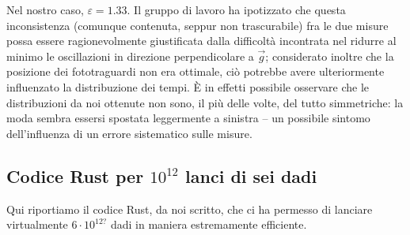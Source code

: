 \documentclass{article}
\begin{document}
Nel nostro caso, $\varepsilon = 1.33$. Il gruppo di lavoro ha ipotizzato che
questa inconsistenza (comunque contenuta, seppur non trascurabile) fra le due
misure possa essere ragionevolmente giustificata dalla difficoltà incontrata
nel ridurre al minimo le oscillazioni in direzione perpendicolare a $\vec{g}$;
considerato inoltre che la posizione dei fototraguardi non era ottimale, ciò
potrebbe avere ulteriormente influenzato la distribuzione dei tempi. È in
effetti possibile osservare che le distribuzioni da noi ottenute non sono,
il più delle volte, del tutto simmetriche: la moda sembra essersi spostata
leggermente a sinistra – un possibile sintomo dell'influenza di un
errore sistematico sulle misure.

\pagebreak
\begin{appendices}
    \section{Codice Rust per $10^{12}$ lanci di sei dadi}
    Qui riportiamo il codice Rust, da noi scritto, che ci ha permesso di
    lanciare virtualmente $6\cdot10^{12?}$ dadi in maniera estremamente
    efficiente.

    \inputminted[linenos, mathescape]{rust}{src/main.rs}
\end{appendices}
\end{document}
